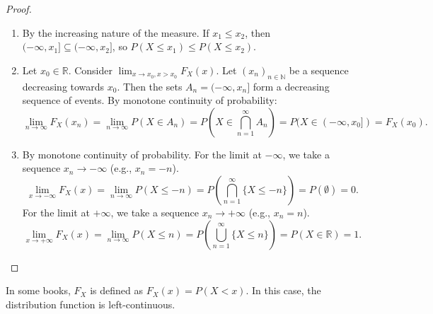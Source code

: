 \begin{proof}
\begin{enumerate}
    \item[i)] By the increasing nature of the measure. If $x_1 \le x_2$, then $(-\infty, x_1] \subseteq (-\infty, x_2]$, so $P(X \le x_1) \le P(X \le x_2)$.
    \item[ii)] Let $x_0 \in \mathbb{R}$. Consider $\lim_{x \to x_0, x > x_0} F_X(x)$.
    Let $(x_n)_{n \in \mathbb{N}}$ be a sequence decreasing towards $x_0$. Then the sets $A_n = (-\infty, x_n]$ form a decreasing sequence of events. By monotone continuity of probability:
    \[
    \lim_{n \to \infty} F_X(x_n) = \lim_{n \to \infty} P(X \in A_n) = P(X \in \bigcap_{n=1}^\infty A_n) = P(X \in (-\infty, x_0]) = F_X(x_0).
    \]
    \item[iii)] By monotone continuity of probability. For the limit at $-\infty$, we take a sequence $x_n \to -\infty$ (e.g., $x_n=-n$).
    \[
    \lim_{x \to -\infty} F_X(x) = \lim_{n \to \infty} P(X \le -n) = P(\bigcap_{n=1}^\infty \{X \le -n\}) = P(\emptyset) = 0.
    \]
    For the limit at $+\infty$, we take a sequence $x_n \to +\infty$ (e.g., $x_n=n$).
    \[
    \lim_{x \to +\infty} F_X(x) = \lim_{n \to \infty} P(X \le n) = P(\bigcup_{n=1}^\infty \{X \le n\}) = P(X \in \mathbb{R}) = 1.
    \]
\end{enumerate}
\end{proof}%
\begin{remark}
In some books, $F_X$ is defined as $F_X(x) = P(X < x)$. In this case, the distribution function is left-continuous.
\end{remark}%
